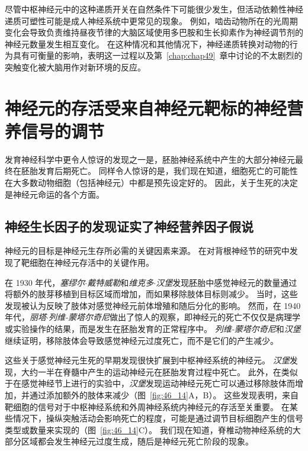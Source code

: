 尽管中枢神经元中的这种递质开关在自然条件下可能很少发生，但活动依赖性神经递质可塑性可能是成人神经系统中更常见的现象。
例如，啮齿动物所在的光周期变化会导致负责维持昼夜节律的大脑区域使用多巴胺和生长抑素作为神经调节剂的神经元数量发生相互变化。
在这种情况和其他情况下，神经递质转换对动物的行为具有可衡量的影响，表明这一过程以及第~\ref{chap:chap49}~章中讨论的不太剧烈的突触变化被大脑用作对新环境的反应。



\section{神经元的存活受来自神经元靶标的神经营养信号的调节}

发育神经科学中更令人惊讶的发现之一是，胚胎神经系统中产生的大部分神经元最终在胚胎发育后期死亡。
同样令人惊讶的是，我们现在知道，细胞死亡的可能性在大多数动物细胞（包括神经元）中都是预先设定好的。
因此，关于生死的决定是神经元命运的各个方面。



\subsection{神经生长因子的发现证实了神经营养因子假说}

神经元的目标是神经元生存所必需的关键因素来源。
在对背根神经节的研究中发现了靶细胞在神经元存活中的关键作用。


在 1930 年代，\textit{塞缪尔$\cdot$戴特威勒}和\textit{维克多$\cdot$汉堡}发现胚胎中感觉神经元的数量通过将额外的肢芽移植到目标区域而增加，而如果移除肢体目标则减少。
当时，这些发现被认为反映了肢体对感觉神经元前体增殖和随后分化的影响。
然而，在 1940 年代，\textit{丽塔$\cdot$列维-蒙塔尔奇尼}做出了惊人的观察，即神经元的死亡不仅仅是病理学或实验操作的结果，而是发生在胚胎发育的正常程序中。
\textit{列维-蒙塔尔奇尼}和\textit{汉堡}继续证明，移除肢体会导致感觉神经元过度死亡，而不是它们的产生减少。


这些关于感觉神经元生死的早期发现很快扩展到中枢神经系统的神经元。
\textit{汉堡}发现，大约一半在脊髓中产生的运动神经元在胚胎发育过程中死亡。
此外，在类似于在感觉神经节上进行的实验中，\textit{汉堡}发现运动神经元死亡可以通过移除肢体而增加，并通过添加额外的肢体来减少（图~\ref{fig:46_14}A，B）。
这些发现表明，来自靶细胞的信号对于中枢神经系统和外周神经系统内神经元的存活至关重要。
在某些情况下，操纵突触活动会影响死亡的程度，可能是通过调节目标细胞产生的信号类型或数量来实现的（图~\ref{fig:46_14}C）。
我们现在知道，脊椎动物神经系统的大部分区域都会发生神经元过度生成，随后是神经元死亡阶段的现象。



